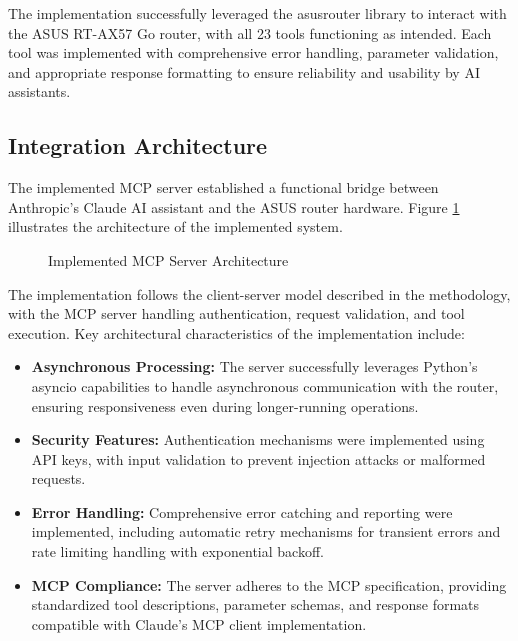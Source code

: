The implementation successfully leveraged the asusrouter library to interact with the ASUS RT-AX57 Go router, with all 23 tools functioning as intended. Each tool was implemented with comprehensive error handling, parameter validation, and appropriate response formatting to ensure reliability and usability by AI assistants.

\subsection{Integration Architecture}
The implemented MCP server established a functional bridge between Anthropic's Claude AI assistant and the ASUS router hardware. Figure \ref{fig:implementation-architecture} illustrates the architecture of the implemented system.

\begin{figure}[h]
\centering
\caption{Implemented MCP Server Architecture}
\label{fig:implementation-architecture}
\end{figure}

The implementation follows the client-server model described in the methodology, with the MCP server handling authentication, request validation, and tool execution. Key architectural characteristics of the implementation include:

\begin{itemize}
\item \textbf{Asynchronous Processing:} The server successfully leverages Python's asyncio capabilities to handle asynchronous communication with the router, ensuring responsiveness even during longer-running operations.
\item \textbf{Security Features:} Authentication mechanisms were implemented using API keys, with input validation to prevent injection attacks or malformed requests.
\item \textbf{Error Handling:} Comprehensive error catching and reporting were implemented, including automatic retry mechanisms for transient errors and rate limiting handling with exponential backoff.
\item \textbf{MCP Compliance:} The server adheres to the MCP specification, providing standardized tool descriptions, parameter schemas, and response formats compatible with Claude's MCP client implementation.
\end{itemize}

